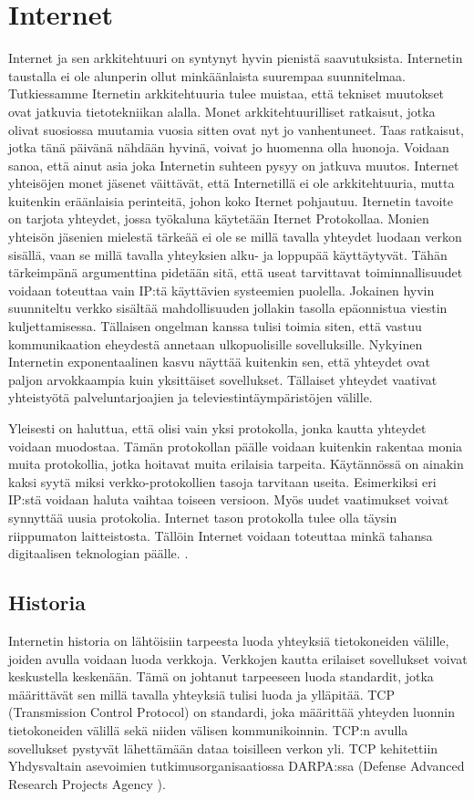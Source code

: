 \documentclass[utf8]{gradu3}
\begin{document}
\chapter{Internet}
Internet ja sen arkkitehtuuri on syntynyt hyvin pienistä saavutuksista. Internetin taustalla ei ole alunperin ollut minkäänlaista suurempaa suunnitelmaa. Tutkiessamme Iternetin arkkitehtuuria tulee muistaa, että tekniset muutokset ovat jatkuvia tietotekniikan alalla. Monet arkkitehtuurilliset ratkaisut, jotka olivat suosiossa muutamia vuosia sitten ovat nyt jo vanhentuneet. Taas ratkaisut, jotka tänä päivänä nähdään hyvinä, voivat jo huomenna olla huonoja. Voidaan sanoa, että ainut asia joka Internetin suhteen pysyy on jatkuva muutos. Internet yhteisöjen monet jäsenet väittävät, että Internetillä ei ole arkkitehtuuria, mutta kuitenkin eräänlaisia perinteitä, johon koko Iternet pohjautuu. Iternetin tavoite on tarjota yhteydet, jossa työkaluna käytetään Iternet Protokollaa. Monien yhteisön jäsenien mielestä tärkeää ei ole se millä tavalla yhteydet luodaan verkon sisällä, vaan se millä tavalla yhteyksien alku- ja loppupää käyttäytyvät. Tähän tärkeimpänä argumenttina pidetään sitä, että useat tarvittavat toiminnallisuudet voidaan toteuttaa vain IP:tä käyttävien systeemien puolella. Jokainen hyvin suunniteltu verkko sisältää mahdollisuuden jollakin tasolla epäonnistua viestin kuljettamisessa. Tällaisen ongelman kanssa tulisi toimia siten, että vastuu kommunikaation eheydestä annetaan ulkopuolisille sovelluksille.  Nykyinen Internetin exponentaalinen kasvu näyttää kuitenkin sen, että yhteydet ovat paljon arvokkaampia kuin yksittäiset sovellukset. Tällaiset yhteydet vaativat yhteistyötä palveluntarjoajien ja televiestintäympäristöjen välille\cite{constant_change}. 

Yleisesti on haluttua, että olisi vain yksi protokolla, jonka kautta yhteydet voidaan muodostaa. Tämän protokollan päälle voidaan kuitenkin rakentaa monia muita protokollia, jotka hoitavat muita erilaisia tarpeita. Käytännössä on ainakin kaksi syytä miksi verkko-protokollien tasoja tarvitaan useita. Esimerkiksi eri IP:stä voidaan haluta vaihtaa toiseen versioon. Myös uudet vaatimukset voivat synnyttää uusia protokolia. Internet tason protokolla tulee olla täysin riippumaton laitteistosta. Tällöin Internet voidaan toteuttaa minkä tahansa digitaalisen teknologian päälle.
 \cite{constant_change}.

\section{Historia}
Internetin historia on lähtöisiin tarpeesta luoda yhteyksiä tietokoneiden välille, joiden avulla voidaan luoda verkkoja. Verkkojen kautta erilaiset sovellukset voivat keskustella keskenään. Tämä on johtanut tarpeeseen luoda standardit, jotka määrittävät sen millä tavalla yhteyksiä tulisi luoda ja ylläpitää. TCP (Transmission Control Protocol) on standardi, joka määrittää yhteyden luonnin tietokoneiden välillä sekä niiden välisen kommunikoinnin. TCP:n avulla sovellukset pystyvät lähettämään dataa toisilleen verkon yli. TCP kehitettiin Yhdysvaltain asevoimien tutkimusorganisaatiossa DARPA:ssa (Defense Advanced Research Projects Agency )\cite{tcp1_1}. 
\end{document}
